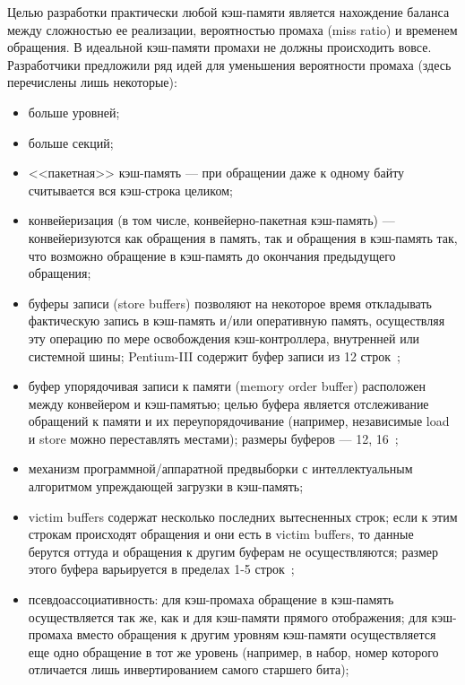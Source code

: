 \documentclass[14pt]{extreport}
\begin{document}
Целью разработки практически любой кэш-памяти является нахождение баланса между сложностью ее реализации, вероятностью промаха (miss ratio) и временем обращения. В идеальной кэш-памяти промахи не должны происходить вовсе. Разработчики предложили ряд идей для уменьшения вероятности промаха (здесь перечислены лишь некоторые):
\begin{itemize}
	\item больше уровней;
	\item больше секций;
	\item <<пакетная>> кэш-память --- при обращении даже к одному байту считывается вся кэш-строка целиком;
	\item конвейеризация (в том числе, конвейерно-пакетная кэш-память) --- конвейеризуются как обращения в память, так и обращения в кэш-память так, что возможно обращение в кэш-память до окончания предыдущего обращения;
	\item буферы записи (store buffers) позволяют на некоторое время откладывать фактическую запись в кэш-память и/или оперативную память, осуществляя эту операцию по мере освобождения кэш-контроллера, внутренней или системной шины; Pentium-III содержит буфер записи из 12 строк~\cite{Kasperski_EffectiveMemory};	
	\item буфер упорядочивая записи к памяти (memory order buffer) расположен между конвейером и кэш-памятью; целью буфера является отслеживание обращений к памяти и их переупорядочивание (например, независимые load и store можно переставлять местами); размеры буферов --- 12, 16~\cite{MOBs};
	\item механизм программной/аппаратной предвыборки с интеллектуальным алгоритмом упреждающей загрузки в кэш-память;
	\item victim buffers содержат несколько последних вытесненных строк; если к этим строкам происходят обращения и они есть в victim buffers, то данные берутся оттуда и обращения к другим буферам не осуществляются; размер этого буфера варьируется в пределах 1-5 строк~\cite{HennesyPatterson};
	\item псевдоассоциативность\cite{HennesyPatterson}: для кэш-промаха обращение в кэш-память осуществляется так же, как и для кэш-памяти прямого отображения; для кэш-промаха вместо обращения к другим уровням кэш-памяти осуществляется еще одно обращение в тот же уровень (например, в набор, номер которого отличается лишь инвертированием самого старшего бита);
\end{itemize}
\end{document}
